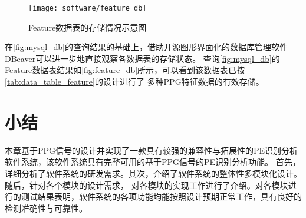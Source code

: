 \begin{figure}[htbp]
    \centering
    \texttt{[image: software/feature\_db]}
    \caption[Feature数据表的存储情况\textcolor{red}{示意图}]{\label{fig:feature_db}Feature数据表的存储情况示意图}
\end{figure}

在\autoref{fig:mysql_db}的查询结果的基础上，借助开源图形界面化的数据库管理软件DBeaver可以进一步地直接观察各数据表的存储状态\cite{dbeaver}。
查询\autoref{fig:mysql_db}的Feature数据表结果如\autoref{fig:feature_db}所示，可以看到该数据表已按\autoref{tab:data_table_feature}的设计进行了
多种PPG特征数据的有效存储。

\section{小结}
本章基于PPG信号的设计并实现了一款具有较强的兼容性与拓展性的PE识别分析软件系统，该软件系统具有完整可用的基于PPG信号的PE识别分析功能。
首先，详细分析了软件系统的研发需求。其次，介绍了软件系统的整体性多模块化设计。随后，针对各个模块的设计需求，
对各模块的实现工作进行了介绍。对各模块进行的测试结果表明，软件系统的各项功能均能按照设计预期正常工作，具有良好的检测准确性与可靠性。